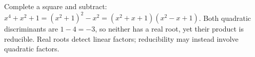 Complete a square and subtract: $x^4+x^2+1=(x^2+1)^2-x^2=\boxed{(x^2+x+1)(x^2-x+1)}$. Both quadratic discriminants are $1-4=-3$, so neither has a real root, yet their product is reducible. Real roots detect linear factors; reducibility may instead involve quadratic factors.
